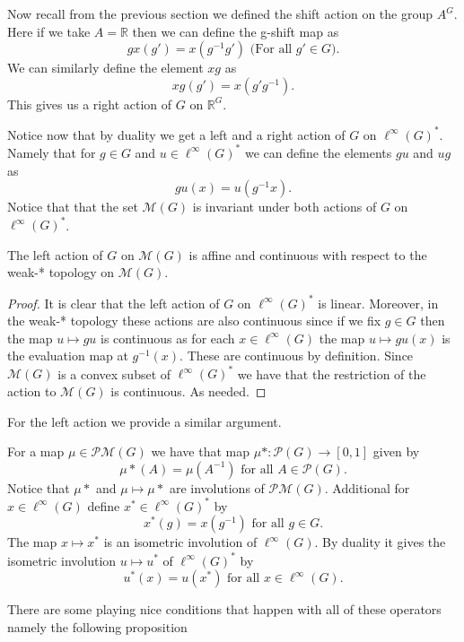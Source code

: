 \begin{defn}
 Now recall from the previous section we defined the shift action on the group
$A^{G}$. Here if we take $A = \mathbb{R}$ then we can define the g-shift map as
\[
  gx(g') = x(g^{-1} g') \textrm{ (For all $g' \in G$)}
.\] 
We can similarly define the element $xg$ as
\[
xg(g') = x(g'g^{-1})
.\] 
This gives us a right action of $G$ on $\mathbb{R}^{G}$.
\end{defn}
Notice now that by duality we get a left and a right action of $G$ on
$\ell^{\infty}(G)^{*}$. Namely that for $g \in G$ and $u \in
\ell^{\infty}(G)^{*}$ we can define the elements $gu$ and $ug$ as
\[
  gu(x) = u(g^{-1}x) \tag{Similar for $ug$ }
.\] 
Notice that that the set $\mathcal{M}(G)$ is invariant under both actions of
$G$ on $\ell^{\infty}(G)^{*}$.

\begin{propn}
  The left action of $G$ on $\mathcal{M}(G)$ is affine and continuous with
  respect to the weak-* topology on $\mathcal{M}(G)$.
\end{propn}
\begin{proof}
  It is clear that the left action of $G$ on $\ell^{\infty}(G)^{*}$ is linear.
  Moreover, in the weak-* topology these actions are also continuous since if
  we fix $g \in G$ then the map $u \mapsto gu$ is continuous as for each $x \in
  \ell^{\infty}(G)$ the map $u \mapsto gu(x)$ is the evaluation map at
  $g^{-1}(x)$. These are continuous by definition. Since $\mathcal{M}(G)$ is
  a convex subset of $\ell^{\infty}(G)^{*}$ we have that the restriction of the
  action to $\mathcal{M}(G)$ is continuous. As needed.
\end{proof}
For the left action we provide a similar argument.

For a map $\mu \in \mathcal{PM}(G)$ we have that map $\mu*: \mathcal{P}(G) \to
[0,1]$ given by
\[
\mu*(A) = \mu(A^{-1}) \textrm{ for all $A \in \mathcal{P}(G)$}
.\] 
Notice that $\mu*$ and $\mu \mapsto \mu*$ are involutions of $\mathcal{PM}(G)$.
Additional for $x \in \ell^{\infty}(G)$ define $x^{*} \in
\ell^{\infty}(G)^{*}$ by
\[
x^{*}(g) = x(g^{-1}) \textrm{ for all $g \in G$}
.\] 
The map $x \mapsto x^{*}$ is an isometric involution of $\ell^{\infty}(G)$. By
duality it gives the isometric involution $u \mapsto u^{*}$ of
$\ell^{\infty}(G)^{*}$ by
\[
u^{*}(x) = u(x^{*}) \textrm{ for all $x \in \ell^{\infty}(G)$}
.\] 

There are some playing nice conditions that happen with all of these operators
namely the following proposition

